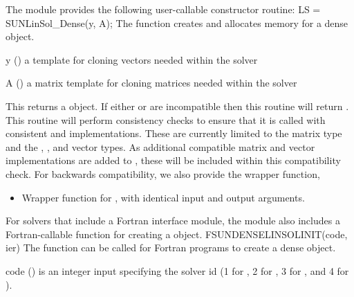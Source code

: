 The module {\sunlinsoldense} provides the following user-callable constructor routine: 
{
  LS = SUNLinSol\_Dense(y, A);
}
{
  The function  creates and allocates memory for
  a dense \\ \noindent {} object.
}
{
  \begin{args}[y]
  \item[y] ()
    a template for cloning vectors needed within the solver
  \item[A] ()
    a {\sunmatdense} matrix template for cloning matrices needed
    within the solver 
  \end{args}
}
{
  This returns a  object.  If either  or
   are incompatible then this routine will return .
}
{
  This routine will perform consistency checks to ensure that it is
  called with consistent {\nvector} and {\sunmatrix} implementations.
  These are currently limited to the {\sunmatdense} matrix type and
  the {\nvecs}, {\nvecopenmp}, and {\nvecpthreads} vector types.  As
  additional compatible matrix and vector implementations are added to
  {\sundials}, these will be included within this compatibility check.
}
For backwards compatibility, we also provide the wrapper function,
\begin{itemize}

\item {}

  Wrapper function for , with identical input and
  output arguments.

\end{itemize}
For solvers that include a Fortran interface module, the {\sunlinsoldense}
module also includes a Fortran-callable function for creating a
 object.
{
  FSUNDENSELINSOLINIT(code, ier)
}
{
  The function  can be called for Fortran programs
  to create a dense  object.
}
{
  \begin{args}[code]
  \item[code] ()
    is an integer input specifying the solver id (1 for {\cvode}, 2
    for {\ida}, 3 for {\kinsol}, and 4 for {\arkode}).
  \end{args}
}

